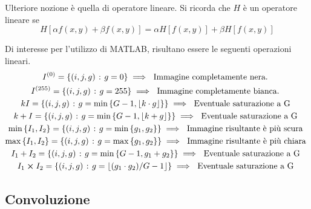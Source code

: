 \documentclass{subfiles}
\begin{document}
\noindent Ulteriore nozione è quella di operatore lineare. Si ricorda che \(H\) è un operatore lineare se
\begin{equation}
    H[\alpha f(x,y) + \beta f(x,y)] = \alpha H[f(x,y)] + \beta H[f(x, y)]
\end{equation}

\noindent Di interesse per l'utilizzo di MATLAB, risultano essere le seguenti operazioni lineari.
\[\begin{gathered}
        I^{(0)} = \set{(i,j,g)}{g = 0} \implies \text{Immagine completamente nera.} \\
        I^{(255)} = \set{(i,j,g)}{g = 255} \implies \text{Immagine completamente bianca.} \\
        kI = \set{(i,j,g)}{g = \min{G - 1, \floor{k \cdot g}}} \implies \text{Eventuale saturazione a G} \\
        k + I = \set{(i,j,g)}{g = \min{G - 1, \floor{k + g}}} \implies \text{Eventuale saturazione a G} \\
        \min{I_{1}, I_{2}} = \set{(i,j,g)}{g = \min{g_{1}, g_{2}}} \implies \text{Immagine risultante è più scura} \\
        \max{I_{1}, I_{2}} = \set{(i,j,g)}{g = \max{g_{1}, g_{2}}} \implies \text{Immagine risultante è più chiara} \\
        I_{1} + I_{2} = \set{(i,j,g)}{g = \min{G - 1, g_{1} + g_{2}}} \implies \text{Eventuale saturazione a G} \\
        I_{1} \cp I_{2} = \set{(i,j,g)}{g = \floor{(g_{1} \cdot g_{2})/G - 1}} \implies \text{Eventuale saturazione a G} \\
    \end{gathered}\]
\clearpage

\subsection{Convoluzione}

\end{document}
